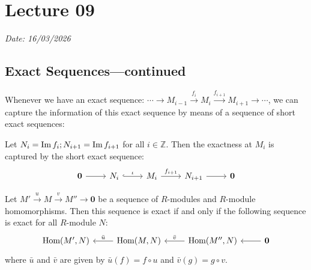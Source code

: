 \chapter{Lecture 09}
\hfill {\footnotesize \textit{Date: 16/03/2026}}
\section{Exact Sequences---continued}
\begin{remark}\label{LongExactToShort}
    Whenever we have an exact sequence: \(\cdots \rightarrow M_{i-1} \xrightarrow{f_i} M_i \xrightarrow{f_{i+1}}M_{i+1} \rightarrow \cdots\), we can capture the information of this exact sequence by means of a sequence of short exact sequences:

    Let \(N_i = \operatorname{Im} f_i; N_{i+1} = \operatorname{Im} f_{i+1}\) for all \(i \in \mathbb{Z}\). Then the exactness at \(M_i\) is captured by the short exact sequence:
\[\begin{tikzcd}
	{\mathbf{0}} & {N_i} & {M_i} & {N_{i+1}} & {\mathbf{0}}
	\arrow[from=1-1, to=1-2]
	\arrow["\iota", hook, from=1-2, to=1-3]
	\arrow["{f_{i+1}}", from=1-3, to=1-4]
	\arrow[from=1-4, to=1-5]
\end{tikzcd}\]
\end{remark}
\begin{proposition}\label{Prop:rexactHom}
    Let \(M' \xrightarrow{u} M \xrightarrow{v} M'' \rightarrow \mathbf{0}\) be a sequence of \(R\)-modules and \(R\)-module homomorphisms. Then this sequence is exact if and only if the following sequence is exact for all \(R\)-module \(N\):
\[\begin{tikzcd}
	{\text{Hom}(M', N)} & {\text{Hom}(M, N)} & {\text{Hom}(M'', N)} & {\mathbf{0}}
	\arrow["{\bar{u}}"', from=1-2, to=1-1]
	\arrow["{\bar{v}}"', from=1-3, to=1-2]
	\arrow[from=1-4, to=1-3]
\end{tikzcd}\]
where \(\bar{u}\) and \(\bar{v}\) are given by \(\bar{u}(f) = f\circ u\) and \(\bar{v}(g) = g\circ v\).
\end{proposition}
\begin{remark}

\end{remark}
